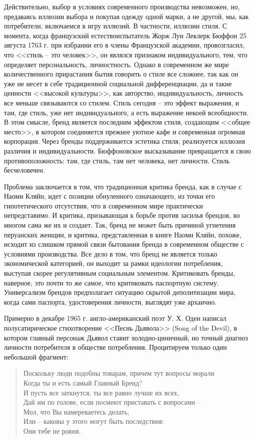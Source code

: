 Действительно, выбор в условиях современного производства невозможен, но, предаваясь иллюзии выбора
и покупая одежду одной марки, а не другой, мы, как потребители, включаемся в игру иллюзий. В
частности, иллюзии стиля. С момента, когда французский естествоиспытатель Жорж Луи Леклерк Бюффон 25
августа 1763 г. при избрании его в члены Французской академии, провозгласил, что <<стиль -- это
человек>>, он являлся признаком индивидуального, тем, что определяет персональность,
личностность. Однако в современном же мире количественного прирастания бытия говорить о стиле все
сложнее, так как он уже не несет в себе традиционной социальной дифференциации, да и такие ценности
<<высокой культуры>>, как авторство, индивидуальность, личность все меньше связываются со
стилем. Стиль сегодня -- это эффект выражения, и там, где стиль, уже нет индивидуального, а есть
выражение некоей всеобщности. В этом смысле, бренд является последним эффектом стиля, создающим
<<общее место>>, в котором соединяется прежнее уютное кафе и современная огромная корпорация. Через
бренды поддерживается эстетика стиля, реализуется иллюзия различия и индивидуальности. Бюффоновское
высказывание превращается в свою противоположность: там, где стиль, там нет человека, нет
личности. Стиль бесчеловечен.

Проблема заключается в том, что традиционная критика бренда, как в случае с Наоми Кляйн, идет с
позиции обнуленного означающего, из точки его гипотетического отсутствия, что в современном мире
практически непредставимо. И критика, призывающая к борьбе против засилья брендов, во многом сама же
их и создает. Так, бренд не может быть причиной угнетения перуанских женщин, и критика,
представленная в книге Наоми Кляйн, похоже, исходит из слишком прямой связи бытования бренда в
современном обществе с условиями производства. Все дело в том, что бренд не является только
экономической категорией, он выходит за рамки идеологии потребления, выступая скорее регулятивным
социальным элементом. Критиковать бренды, наверное, это почти то же самое, что критиковать
паспортную систему. Универсализм брендов предполагает ситуацию скрытой деполитизации мира, когда
сами паспорта, удостоверения личности, выглядят уже архаично.

Примерно в декабре 1965 г. англо-американский поэт У. Х. Оден написал полусатирическое
стихотворение <<Песнь Дьявола>> (Song of the Devil), в котором главный персонаж Дьявол ставит
холодно-циничный, но точный диагноз личности потребителя в обществе потребления. Процитируем только
один небольшой фрагмент:
\begin{verse}
Поскольку люди подобны товарам, причем тут вопросы морали \\
Когда ты и есть самый Главный Бренд? \\
И пусть все заткнутся, ты все равно лучше их всех, \\
Дай им по голове, если посмеют приставать с вопросами -- \\
Мол, что Вы намереваетесь делать, \\
Или -- каковы у этого могут быть последствия: \\
Они тебе не ровня.
\end{verse}

